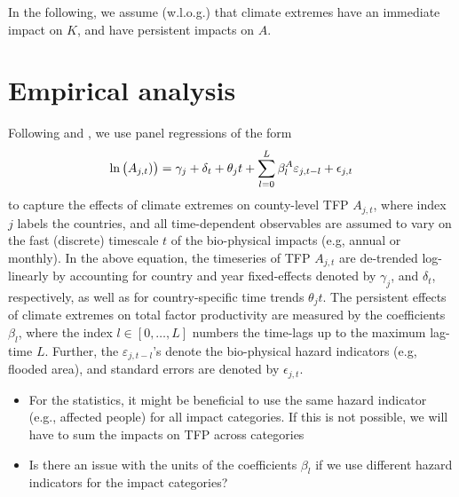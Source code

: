 \documentclass[preprint,3p,authoryear]{elsarticle}
\begin{document}
In the following, we assume (w.l.o.g.) that climate extremes have an immediate impact on $K$, and have persistent impacts on $A$.

\section{Empirical analysis}
\label{sec:empAna}
Following \citet{BAK19} and \citet{HSI14}, we use panel regressions of the form
\begin{equation}
  \label{eq:PRA}
  \ln\big(A_{j,t})\big) = \gamma_j + \delta_{t} + \theta_j t + \sum_{l=0}^{L}\beta^A_{l}\varepsilon_{j,t-l}+\epsilon_{j,t}
\end{equation}
to capture the effects of climate extremes on county-level TFP $A_{j,t}$, where index $j$ labels the countries, and all time-dependent observables are assumed to vary on the fast (discrete) timescale $t$ of the bio-physical impacts (e.g, annual or monthly).
In the above equation, the timeseries of TFP $A_{j,t}$ are de-trended log-linearly by accounting for country and year fixed-effects denoted by $\gamma_j$, and $\delta_t$, respectively, as well as for country-specific time trends $\theta_j t$. The persistent effects of climate extremes on total factor productivity are measured by the coefficients $\beta_l$, where the index $l\in[0,\ldots,L]$ numbers the time-lags up to the maximum lag-time $L$. Further, the $\varepsilon_{j,t-l}$'s denote the bio-physical hazard indicators (e.g, flooded area), and standard errors are denoted by $\epsilon_{j,t}$.
\begin{itemize}
\item For the statistics, it might be beneficial to use the same hazard indicator (e.g., affected people) for all impact categories. If this is not possible, we will have to sum the impacts on TFP across categories
  \item Is there an issue with the units of the coefficients $\beta_l$ if we use different hazard indicators for the impact categories?
\end{itemize}
\end{document}
